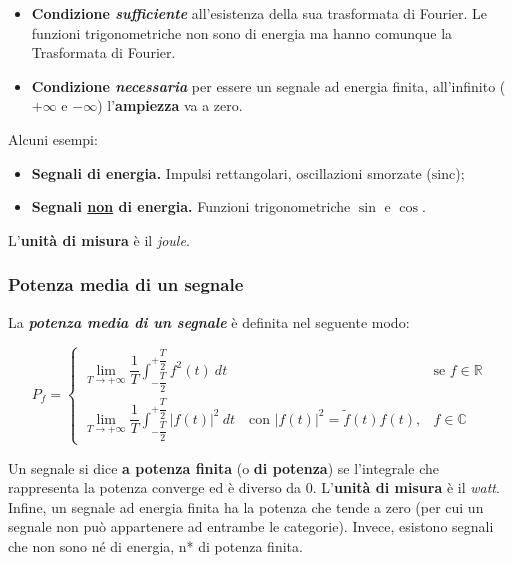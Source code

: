 \documentclass[a4paper]{article}
\begin{document}
	\begin{itemize}
		\item[\ding{43}] \textbf{Condizione \emph{sufficiente}} all'esistenza della sua trasformata di Fourier. Le funzioni trigonometriche non sono di energia ma hanno comunque la Trasformata di Fourier.
		\item[\ding{42}] \textbf{Condizione \emph{necessaria}} per essere un segnale ad energia finita, all'infinito ($+\infty$ e $-\infty$) l'\textbf{ampiezza} va a zero.
	\end{itemize}

	\noindent
	Alcuni esempi:

	\begin{itemize}
		\item[\ding{80}] \textbf{Segnali di energia.} Impulsi rettangolari, oscillazioni smorzate ($\mathrm{sinc}$);
		\item[\ding{80}] \textbf{Segnali \underline{non} di energia.} Funzioni trigonometriche $\sin$ e $\cos$.
	\end{itemize}

	\noindent
	L'\textbf{unità di misura} è il \emph{joule}.
	
	\subsubsection{Potenza media di un segnale}
	
	La \textbf{\emph{potenza media di un segnale}} è definita nel seguente modo:
	
	\begin{equation*}
		P_f =
		\begin{cases}
			\displaystyle \lim_{T \rightarrow +\infty} \dfrac{1}{T} \int_{-\dfrac{T}{2}}^{+\dfrac{T}{2}} f^{2}(t)\: dt & \text{se } f \in \mathbb{R} \\
			\displaystyle \lim_{T \rightarrow +\infty} \dfrac{1}{T} \int_{-\dfrac{T}{2}}^{+\dfrac{T}{2}} \left|f(t)\right|^{2}\: dt \hspace{1em} \text{con } \left| f(t) \right|^{2} = \tilde{f}(t) f(t), & f \in \mathbb{C}
		\end{cases}
	\end{equation*}
	
	\noindent
	Un segnale si dice \textbf{a potenza finita} (o \textbf{di potenza}) se l'integrale che rappresenta la potenza converge ed è diverso da $0$. L'\textbf{unità di misura} è il \emph{watt}.\newline
	Infine, un segnale ad energia finita ha la potenza che tende a zero (per cui un segnale non può appartenere ad entrambe le categorie). Invece, esistono segnali che non sono né di energia, n* di potenza finita.
	
\end{document}
